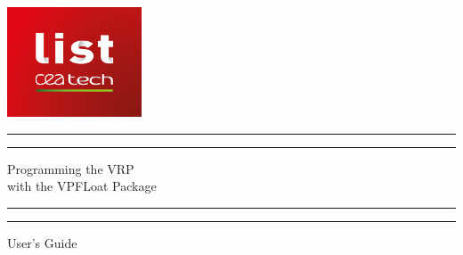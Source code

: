 \documentclass[11pt]{report}
\begin{document}
\begin{titlepage} %

  \centering %
   \includegraphics[width=4cm]{List_logo} 
	
	\scshape %
	
	\vspace*{\baselineskip} %
	
	
	\rule{\textwidth}{1.6pt}\vspace*{-\baselineskip}\vspace*{2pt} %
	\rule{\textwidth}{0.4pt} %
	
	\vspace{0.75\baselineskip} %
	
	{\LARGE Programming the VRP \\ with the VPFLoat Package \\} %
	
	\vspace{0.75\baselineskip} %
	
	\rule{\textwidth}{0.4pt}\vspace*{-\baselineskip}\vspace{3.2pt} %
	\rule{\textwidth}{1.6pt} %
	
	\vspace{2\baselineskip} %
	
	
	User's Guide
	
	\vspace*{3\baselineskip} %
	
	

\end{titlepage}
\end{document}
